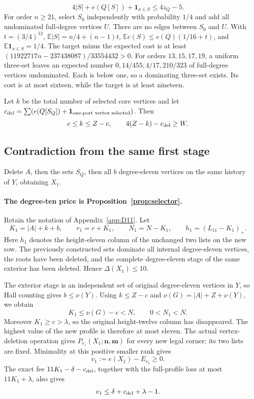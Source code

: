 \documentclass[11pt,a4paper]{article}
\newcommand{\nn}{\mathbf n}\newcommand{\mm}{\mathbf m}
\theoremstyle{definition}
\begin{document}
\[
4|S|+e(Q[S])+\mathbf1_{x\in S}\le4z_Q-5.
\]
For order $n\ge21$, select $S_0$ independently with probability $1/4$ and add all undominated full-degree vertices $U$. There are no edges between $S_0$ and $U$. With $t=(3/4)^{12}$,
$\mathbb E|S|=n/4+(n-1)t$,
$\mathbb Ee(S)\le e(Q)(1/16+t)$, and
$\mathbb E\mathbf1_{x\in S}=1/4$.
The target minus the expected cost is at least
$(11922717n-237438087)/33554432>0$.
For orders $13,15,17,19$, a uniform three-set leaves an expected number
$0,14/455,4/17,210/323$ of full-degree vertices undominated. Each is below one, so a dominating three-set exists. Its cost is at most sixteen, while the target is at least nineteen.

Let $k$ be the total number of selected core vertices and let
$c_{\rm del}=\sum(e(Q[S_Q])+\mathbf1_{\text{one-port vertex selected}})$.
Then
\[
c\le k\le Z-c,\qquad 4(Z-k)-c_{\rm del}\ge W.
\]
\subsection{Contradiction from the same first stage}
Delete $A$, then the sets $S_Q$, then all $b$ degree-eleven vertices on the same history of $Y$, obtaining $X_1$.
\paragraph{The degree-ten price is Proposition~\ref{prop:selector}.}
Retain the notation of Appendix~\ref{app:D11}.  Let
\[
 K_1=|A|+k+b,\qquad r_1=r+K_1,\qquad
 N_1=N-K_1,\qquad h_1=(L_{11}-K_1)_+.
\]
Here \(h_1\) denotes the height-eleven column of the unchanged two lists
on the new row.  The previously constructed sets dominate all internal
degree-eleven vertices, the roots have been deleted, and the complete
degree-eleven stage of the same exterior has been deleted.  Hence
\(\Delta(X_1)\le10\).

The exterior stage is an independent set of original degree-eleven
vertices in \(Y\), so Hall counting gives \(b\le\nu(Y)\).  Using
\(k\le Z-c\) and \(\nu(G)=|A|+Z+\nu(Y)\), we obtain
\[
 K_1\le\nu(G)-c<N,\qquad 0<N_1<N.
\]
Moreover \(K_1\ge c>\lambda\), so the original height-twelve column
has disappeared.  The highest value of the new profile is therefore
at most eleven.  The actual vertex-deletion operation gives
\(P_{r_1}(X_1;\nn,\mm)\) for every new legal corner; its two lists
are fixed.  Minimality at this positive smaller rank gives
\[
 v_1:=e(X_1)-E_{r_1}\ge0.
\]
The exact fee \(11K_1-\delta-c_{\rm del}\), together with the full-profile
loss at most \(11K_1+\lambda\), also gives
\[
 v_1\le\delta+c_{\rm del}+\lambda-1.
\]
\end{document}
